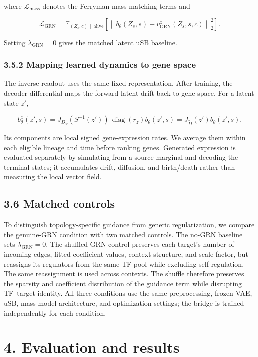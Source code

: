 \documentclass[
  11pt,
  letterpaper,
]{article}
\begin{document}
where \(\mathcal{L}_{\mathrm{mass}}\) denotes the Ferryman mass-matching
terms and

\[
\mathcal{L}_{\mathrm{GRN}}
=\mathbb{E}_{(Z_s,c)\,\mid\,\mathrm{alive}}
\left[
\left\lVert b_\theta(Z_s,s)-v_{\mathrm{GRN}}^z(Z_s,s,c)\right\rVert_2^2
\right].
\]

Setting \(\lambda_{\mathrm{GRN}}=0\) gives the matched latent uSB
baseline.

\subsubsection{3.5.2 Mapping learned dynamics to gene
space}\label{mapping-learned-dynamics-to-gene-space}

The inverse readout uses the same fixed representation. After training,
the decoder differential maps the forward latent drift back to gene
space. For a latent state \(z'\),

\[
b_\theta^x(z',s)
=J_{D_\psi}(S^{-1}(z'))\,\operatorname{diag}(r_z)b_\theta(z',s)
=J_{\widetilde D}(z')b_\theta(z',s).
\]

Its components are local signed gene-expression rates. We average them
within each eligible lineage and time before ranking genes. Generated
expression is evaluated separately by simulating from a source marginal
and decoding the terminal states; it accumulates drift, diffusion, and
birth/death rather than measuring the local vector field.

\subsection{3.6 Matched controls}\label{matched-controls}

To distinguish topology-specific guidance from generic regularization,
we compare the genuine-GRN condition with two matched controls. The
no-GRN baseline sets \(\lambda_{\mathrm{GRN}}=0\). The shuffled-GRN
control preserves each target's number of incoming edges, fitted
coefficient values, context structure, and scale factor, but reassigns
its regulators from the same TF pool while excluding self-regulation.
The same reassignment is used across contexts. The shuffle therefore
preserves the sparsity and coefficient distribution of the guidance term
while disrupting TF--target identity. All three conditions use the same
preprocessing, frozen VAE, uSB, mass-model architecture, and
optimization settings; the bridge is trained independently for each
condition.

\section{4. Evaluation and results}\label{evaluation-and-results}
\end{document}
